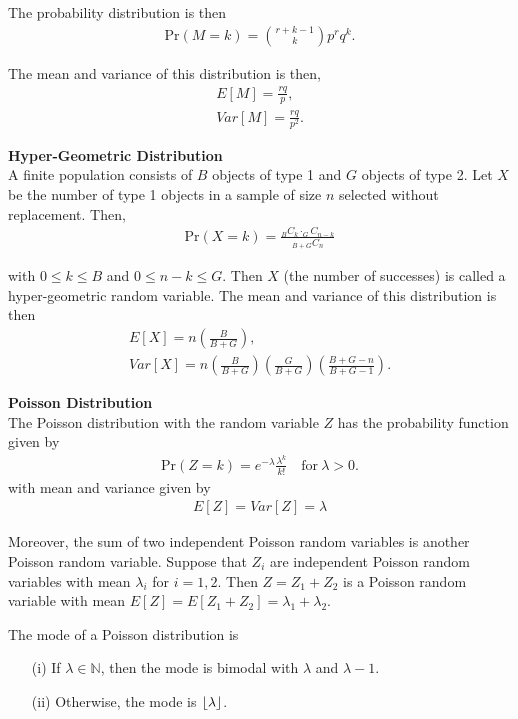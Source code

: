 \documentclass{article}
\DeclarePairedDelimiter\floor{\lfloor}{\rfloor}
\numberwithin{theorem}{subsection}
\numberwithin{theorem}{subsubsection}
\numberwithin{lemma}{subsection}
\numberwithin{lemma}{subsubsection}
\theoremstyle{definition}
\numberwithin{definition}{subsection}
\numberwithin{definition}{subsubsection}
\begin{document}
\indent The probability distribution is then
\begin{gather*}
    \text{Pr}(M=k) = {r+k-1 \choose k} p^{r}q^{k}.
\end{gather*}

\noindent The mean and variance of this distribution is then,
\begin{gather*}
    E[M] = \frac{rq}{p},\\
    Var[M] = \frac{rq}{p^{2}}.
\end{gather*}

\noindent \textbf{Hyper-Geometric Distribution} \\
\indent A finite population consists of $B$ objects of type 1 and $G$ objects of type 2. Let $X$ be the number of type 1 objects in a sample of size $n$ selected without replacement. Then,
\begin{gather*}
    \text{Pr}(X = k) = \frac{_{B}C_{k} \cdot _{G}C_{n-k}}{_{B+G}C_{n}}
\end{gather*}

\noindent with $0 \leq k \leq B$ and $0 \leq n - k \leq G$. Then $X$ (the number of successes) is called a hyper-geometric random variable. The mean and variance of this distribution is then
\begin{gather*}
    E[X] = n\left ( \frac{B}{B+G}\right ),\\
    Var[X] = n\left ( \frac{B}{B+G}\right ) \left ( \frac{G}{B+G}\right ) \left ( \frac{B+G-n}{B+G-1}\right ).
\end{gather*}

\noindent \textbf{Poisson Distribution} \\
\indent The Poisson distribution with the random variable $Z$ has the probability function given by
\begin{gather*}
    \text{Pr}(Z=k) = e^{-\lambda} \frac{\lambda^{k}}{k!} \quad \text{for}\ \lambda > 0.
\end{gather*}
\noindent with mean and variance given by
\begin{gather*}
    E[Z] = Var[Z] = \lambda
\end{gather*}

Moreover, the sum of two independent Poisson random variables is another Poisson random variable. Suppose that $Z_{i}$ are independent Poisson random variables with mean $\lambda_{i}$ for $i = 1,2$. Then $Z = Z_{1} + Z_{2}$ is a Poisson random variable with mean $E[Z] = E[Z_{1} + Z_{2}] = \lambda_{1} + \lambda_{2}$.\par
The mode of a Poisson distribution is 
\begin{itemize}
    \item[(i)] If $\lambda \in \mathbb{N}$, then the mode is bimodal with $\lambda$ and $\lambda - 1$.
    \item[(ii)] Otherwise, the mode is $\floor*{\lambda}$.
\end{itemize}
\end{document}
